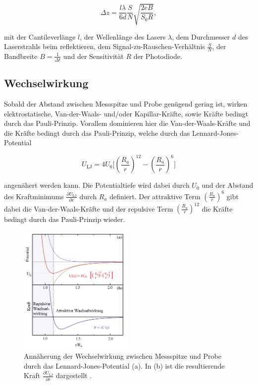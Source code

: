 \begin{equation}
  \Delta z = \frac{l \lambda}{6 d} \frac{S}{N} \sqrt{\frac{2eB}{S_0 R}},
  \label{eq:F3}
\end{equation}

\noindent
mit der Cantileverlänge $l$, der Wellenlänge des Lasers $\lambda$, dem Durchmesser
$d$ des Laserstrahls beim reflektieren, dem Signal-zu-Rauschen-Verhältnis $\frac{S}{N}$,
der Bandbreite $B=\frac{1}{\Delta t}$ und der Sensitivität $R$ der Photodiode.

\subsection{Wechselwirkung}
\label{sec:Wechselwirkung}

Sobald der Abstand zwischen Messspitze und Probe genügend gering ist, wirken
elektrostatische, Van-der-Waals- und/oder Kapillar-Kräfte, sowie Kräfte bedingt
durch das Pauli-Prinzip. Vorallem dominieren hier die Van-der-Waals-Kräfte und die
Kräfte bedingt durch das Pauli-Prinzip, welche durch das Lennard-Jones-Potential

\begin{equation}
	U_{\text{LJ}} = 4U_0 \biggl[
		\left(\frac{R_a}{r}\right)^{12} - \left(\frac{R_a}{r}\right)^6
	\biggr]
	\label{eg:F4}
\end{equation}

\noindent
angenähert werden kann. Die Potentialtiefe wird dabei durch $U_0$
und der Abstand des Kraftminimums $\frac{\partial U_{\text{LJ}}}{\partial r}$
durch $R_a$ definiert. Der attraktive Term $\left(\frac{R_a}{r}\right)^6$
gibt dabei die Van-der-Waals-Kräfte und der repulsive Term
$\left(\frac{R_a}{r}\right)^{12}$ die Kräfte bedingt durch das Pauli-Prinzip
wieder.

\begin{figure}[H]
	\centering
	\includegraphics[width=0.5\textwidth]{Abb/LJ.png}
	\caption{Annäherung der Wechselwirkung zwischen Messspitze und Probe durch
	das Lennard-Jones-Potential (a). In (b) ist die resultierende Kraft
	$\frac{\partial U_{\text{LJ}}}{\partial r}$ dargestellt \cite[148]{AFM}.}
	\label{fig:LJ}
\end{figure}

